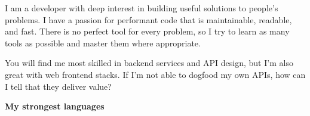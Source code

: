 \documentclass[9pt]{developercv} %
\begin{document}
\vspace{0.5cm}



\begin{minipage}[t]{0.4\textwidth} %
  \vspace{-\baselineskip} %

  I am a developer with deep interest in building useful solutions to people's
  problems. I have a passion for performant code that is maintainable,
  readable, and fast. There is no perfect tool for every problem, so I try to
  learn as many tools as possible and master them where appropriate.

  You will find me most skilled in backend services and API design, but I'm
  also great with web frontend stacks. If I'm not able to dogfood my own APIs,
  how can I tell that they deliver value?
\end{minipage}
\hfill %
\begin{minipage}[t]{0.5\textwidth} %
  \vspace{-\baselineskip} %
  \textbf{My strongest languages}
  \begin{barchart}{5.5}
  \end{barchart}
\end{minipage}

\begin{center}
\end{center}


\end{document}
